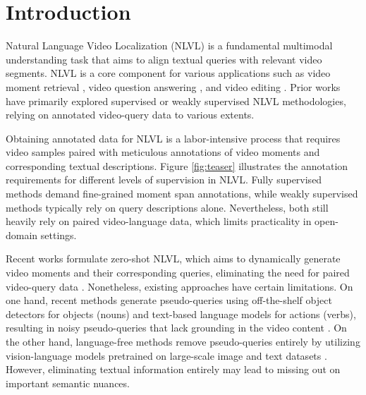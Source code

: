 \section{Introduction}
\label{sec:intro}

Natural Language Video Localization (NLVL) is a fundamental multimodal understanding task that aims to align textual queries with relevant video segments. NLVL is a core component for various applications such as video moment retrieval \cite{cao_visual_2022}, video question answering \cite{qian_locate_2022,lei_tvqa_2020}, and video editing \cite{gao_end--end_2022}. Prior works have primarily explored supervised 
\cite{zeng_dense_2020, 
wang_temporally_2020, 
soldan_vlg-net_2021, 
liu_context-aware_2021, 
yu_intra-_2020, 
gao_relation-aware_2021} 
or weakly supervised \cite{mun_local-global_2020, zhang_counterfactual_2020, zhang_video_2021} NLVL methodologies, relying on annotated video-query data to various extents.

Obtaining annotated data for NLVL is a labor-intensive process that requires video samples paired with meticulous annotations of video moments and corresponding textual descriptions. Figure \ref{fig:teaser} illustrates the annotation requirements for different levels of supervision in NLVL. Fully supervised methods demand fine-grained moment span annotations, while weakly supervised methods typically rely on query descriptions alone. Nevertheless, both still heavily rely on paired video-language data, which limits practicality in open-domain settings.


Recent works formulate zero-shot NLVL, which aims to dynamically generate video moments and their corresponding queries, eliminating the need for paired video-query data \cite{nam_zero-shot_2021,kim2023language}. Nonetheless, existing approaches have certain limitations. On one hand, recent methods generate pseudo-queries using off-the-shelf object detectors for objects (nouns) and text-based language models for actions (verbs), resulting in noisy pseudo-queries that lack grounding in the video content \cite{nam_zero-shot_2021}. On the other hand, language-free methods remove pseudo-queries entirely by utilizing vision-language models pretrained on large-scale image and text datasets \cite{kim2023language}. However, eliminating textual information entirely may lead to missing out on important semantic nuances.

